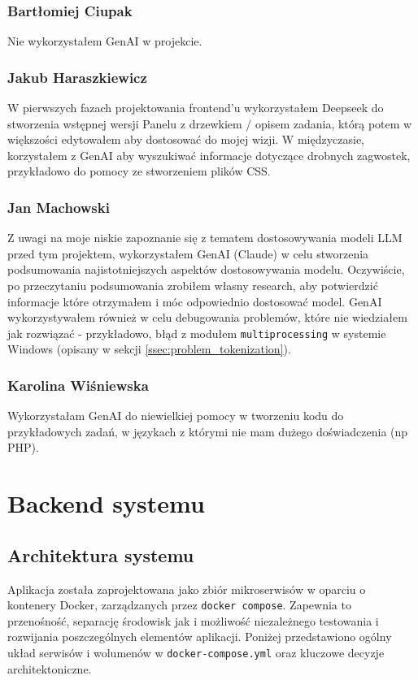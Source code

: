\documentclass[12pt,a4paper]{article}
\begin{document}
\subsubsection*{Bartłomiej Ciupak}
Nie wykorzystałem GenAI w projekcie.

\subsubsection*{Jakub Haraszkiewicz}
W pierwszych fazach projektowania frontend'u wykorzystałem Deepseek do stworzenia wstępnej wersji Panelu z drzewkiem / opisem zadania, którą potem w większości edytowałem aby dostosować do mojej wizji. W międzyczasie, korzystałem z GenAI aby wyszukiwać informacje dotyczące drobnych zagwostek, przykładowo do pomocy ze stworzeniem plików CSS.
\subsubsection*{Jan Machowski}
Z uwagi na moje niskie zapoznanie się z tematem dostosowywania modeli LLM przed tym projektem, wykorzystałem GenAI (Claude) w celu stworzenia podsumowania najistotniejszych aspektów dostosowywania modelu. Oczywiście, po przeczytaniu podsumowania zrobiłem własny research, aby potwierdzić informacje które otrzymałem i móc odpowiednio dostosować model. GenAI wykorzystywałem również w celu debugowania problemów, które nie wiedziałem jak rozwiązać - przykładowo, błąd z modułem \texttt{multiprocessing} w systemie Windows (opisany w sekcji \ref{ssec:problem_tokenization}).  

\subsubsection*{Karolina Wiśniewska}
Wykorzystałam GenAI do niewielkiej pomocy w tworzeniu kodu do przykładowych zadań, w językach z którymi nie mam dużego doświadczenia (np PHP). 

\section{Backend systemu}
\subsection{Architektura systemu}
Aplikacja została zaprojektowana jako zbiór mikroserwisów w oparciu o kontenery Docker, zarządzanych przez \texttt{docker compose}. Zapewnia to przenośność, separację środowisk jak i możliwość niezależnego testowania i rozwijania poszczególnych elementów aplikacji. Poniżej przedstawiono ogólny układ serwisów i wolumenów w \texttt{docker-compose.yml} oraz kluczowe decyzje architektoniczne. 
\end{document}
